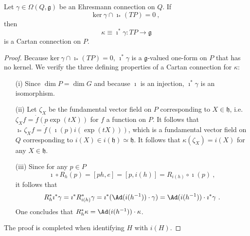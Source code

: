 \documentclass[11pt]{article}
\begin{document}
\begin{proposition}
	Let $\gamma \in \Omega(Q,\mathfrak{g})$ be an Ehresmann 
	connection on $Q$. If
	\begin{displaymath}
		\mathrm{ker}~\gamma \cap \imath_\ast(TP) = 0~,
	\end{displaymath}
	then
	\begin{equation}
		\kappa \equiv \imath^\ast\gamma : TP \to \mathfrak{g}
	\end{equation}
	is a Cartan connection on $P$.
\end{proposition}
\begin{proof}
	Because $\mathrm{ker}~\gamma \cap \imath_\ast(TP) = 0$, 
	$\imath^\ast\gamma$ is a $\mathfrak{g}$-valued one-form on $P$ 
	that has no kernel. We verify the three defining properties of 
	a Cartan connection for $\kappa$:
	\begin{itemize}
		\item[(i)] Since $\dim P = \dim G$ and because $\imath$ is an 
			injection, $\imath^\ast \gamma$ is an isomorphism.
		\item[(ii)] Let $\zeta_X$ be the fundamental vector field on 
			$P$ corresponding to $X \in \mathfrak{h}$, i.e.~$\zeta_X f 
			= \dot{f}(p\exp(tX))$ for $f$ a function on $P$. It follows 
			that $\imath_\ast \zeta_X f = \dot{f}(\imath(p) 
			i(\exp(tX)))$, which is a fundamental vector field on $Q$ 
			corresponding to $i(X) \in i(\mathfrak{h}) \simeq 
			\mathfrak{h}$.  It follows that $\kappa(\zeta_X) = i(X)$ 
			for any $X \in \mathfrak{h}$.
		\item[(iii)] Since for any $p \in P$
			\begin{displaymath}
				\imath \circ R_h(p) = [ph,e] = [p,i(h)] = R_{i(h)} \circ 
				\imath(p)~,
			\end{displaymath}
			it follows that
			\begin{displaymath}
				R^\ast_h \imath^\ast \gamma =	\imath^\ast R^\ast_{i(h)} 
				\gamma = \imath^\ast (\Ad(i(h^{-1})) \cdot \gamma) = 
				\Ad(i(h^{-1})) \cdot \imath^\ast \gamma~.
			\end{displaymath}
			One concludes that $R^\ast_h \kappa = \Ad(i(h^{-1}))\cdot 
			\kappa$.
	\end{itemize}
	The proof is completed when identifying $H$ with $i(H)$.
\end{proof}






\end{document}
